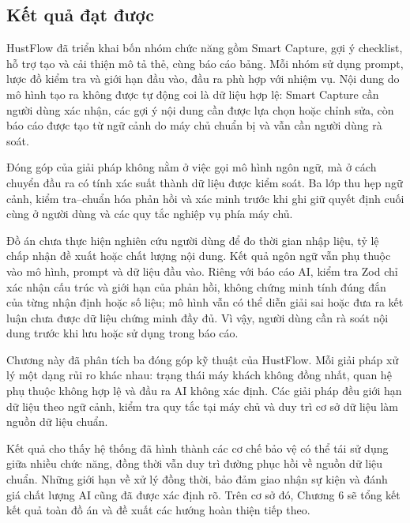 \documentclass[../DoAn.tex]{subfiles}
\begin{document}
\subsection{Kết quả đạt được}
\label{subsection:5.3.3}

HustFlow đã triển khai bốn nhóm chức năng gồm Smart Capture, gợi ý checklist, hỗ trợ tạo và cải thiện mô tả thẻ, cùng báo cáo bảng. Mỗi nhóm sử dụng prompt, lược đồ kiểm tra và giới hạn đầu vào, đầu ra phù hợp với nhiệm vụ. Nội dung do mô hình tạo ra không được tự động coi là dữ liệu hợp lệ: Smart Capture cần người dùng xác nhận, các gợi ý nội dung cần được lựa chọn hoặc chỉnh sửa, còn báo cáo được tạo từ ngữ cảnh do máy chủ chuẩn bị và vẫn cần người dùng rà soát.

Đóng góp của giải pháp không nằm ở việc gọi mô hình ngôn ngữ, mà ở cách chuyển đầu ra có tính xác suất thành dữ liệu được kiểm soát. Ba lớp thu hẹp ngữ cảnh, kiểm tra--chuẩn hóa phản hồi và xác minh trước khi ghi giữ quyết định cuối cùng ở người dùng và các quy tắc nghiệp vụ phía máy chủ.

Đồ án chưa thực hiện nghiên cứu người dùng để đo thời gian nhập liệu, tỷ lệ chấp nhận đề xuất hoặc chất lượng nội dung. Kết quả ngôn ngữ vẫn phụ thuộc vào mô hình, prompt và dữ liệu đầu vào. Riêng với báo cáo AI, kiểm tra Zod chỉ xác nhận cấu trúc và giới hạn của phản hồi, không chứng minh tính đúng đắn của từng nhận định hoặc số liệu; mô hình vẫn có thể diễn giải sai hoặc đưa ra kết luận chưa được dữ liệu chứng minh đầy đủ. Vì vậy, người dùng cần rà soát nội dung trước khi lưu hoặc sử dụng trong báo cáo.


Chương này đã phân tích ba đóng góp kỹ thuật của HustFlow. Mỗi giải pháp xử lý một dạng rủi ro khác nhau: trạng thái máy khách không đồng nhất, quan hệ phụ thuộc không hợp lệ và đầu ra AI không xác định. Các giải pháp đều giới hạn dữ liệu theo ngữ cảnh, kiểm tra quy tắc tại máy chủ và duy trì cơ sở dữ liệu làm nguồn dữ liệu chuẩn.

Kết quả cho thấy hệ thống đã hình thành các cơ chế bảo vệ có thể tái sử dụng giữa nhiều chức năng, đồng thời vẫn duy trì đường phục hồi về nguồn dữ liệu chuẩn. Những giới hạn về xử lý đồng thời, bảo đảm giao nhận sự kiện và đánh giá chất lượng AI cũng đã được xác định rõ. Trên cơ sở đó, Chương 6 sẽ tổng kết kết quả toàn đồ án và đề xuất các hướng hoàn thiện tiếp theo.
\end{document}
